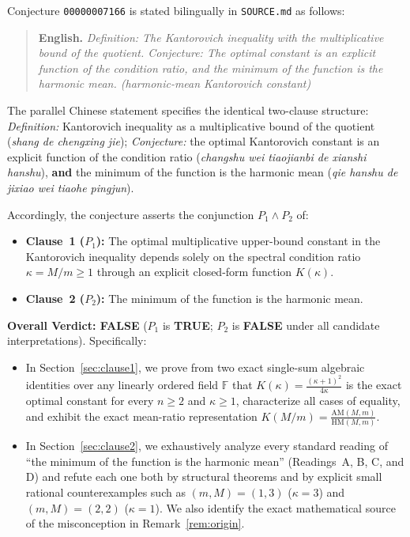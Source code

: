 \documentclass[11pt,a4paper]{article}
\theoremstyle{definition}
\newcommand{\AM}{\mathrm{AM}}
\newcommand{\HM}{\mathrm{HM}}
\begin{document}
Conjecture \texttt{00000007166} is stated bilingually in \texttt{SOURCE.md} as
follows:
\begin{quote}
\textbf{English.} \emph{Definition: The Kantorovich inequality with the
multiplicative bound of the quotient. Conjecture: The optimal constant is an
explicit function of the condition ratio, and the minimum of the function is the
harmonic mean. (harmonic-mean Kantorovich constant)}
\end{quote}
The parallel Chinese statement specifies the identical two-clause structure:
\emph{Definition:} Kantorovich inequality as a multiplicative bound of the
quotient (\emph{shang de chengxing jie}); \emph{Conjecture:} the optimal
Kantorovich constant is an explicit function of the condition ratio
(\emph{changshu wei tiaojianbi de xianshi hanshu}), \textbf{and} the minimum of
the function is the harmonic mean (\emph{qie hanshu de jixiao wei tiaohe
pingjun}).

Accordingly, the conjecture asserts the conjunction $P_1 \land P_2$ of:
\begin{itemize}
  \item[(1)] \textbf{Clause~1 ($P_1$):} The optimal multiplicative upper-bound
  constant in the Kantorovich inequality depends solely on the spectral condition
  ratio $\kappa = M/m \ge 1$ through an explicit closed-form function $K(\kappa)$.
  \item[(2)] \textbf{Clause~2 ($P_2$):} The minimum of the function is the harmonic
  mean.
\end{itemize}

\textbf{Overall Verdict: FALSE} ($P_1$ is \textbf{TRUE}; $P_2$ is \textbf{FALSE}
under all candidate interpretations). Specifically:
\begin{itemize}
  \item In Section~\ref{sec:clause1}, we prove from two exact single-sum
  algebraic identities over any linearly ordered field $\mathbb{F}$ that
  $K(\kappa) = \frac{(\kappa + 1)^2}{4\kappa}$ is the exact optimal constant for
  every $n \ge 2$ and $\kappa \ge 1$, characterize all cases of equality, and
  exhibit the exact mean-ratio representation $K(M/m) = \frac{\AM(M,m)}{\HM(M,m)}$.
  \item In Section~\ref{sec:clause2}, we exhaustively analyze every standard
  reading of ``the minimum of the function is the harmonic mean'' (Readings~A, B,
  C, and D) and refute each one both by structural theorems and by explicit small
  rational counterexamples such as $(m,M) = (1,3)$ ($\kappa = 3$) and
  $(m,M) = (2,2)$ ($\kappa = 1$). We also identify the exact mathematical source
  of the misconception in Remark~\ref{rem:origin}.
\end{itemize}
\end{document}
